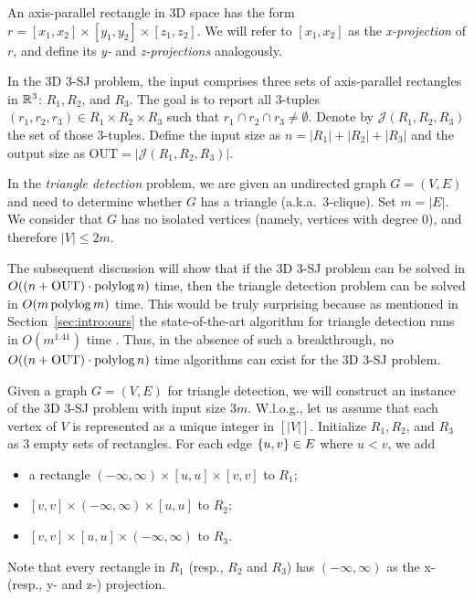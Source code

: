 \documentclass[sigconf]{acmart}
\def\vgap{\vspace{0mm}}
\def\J{\mathcal{J}}
\def\out{\mathrm{OUT}}
\begin{document}
{{{An axis-parallel rectangle in 3D space has the form $r = [x_1, x_2] \times [y_1, y_2] \times [z_1, z_2]$. We will refer to $[x_1, x_2]$ as the {\em x-projection} of $r$, and define its {\em y-} and {\em z-projections} analogously.


\vgap

In the 3D 3-SJ problem, the input comprises three sets of axis-parallel rectangles in $\mathbb{R}^3$: $R_1, R_2$, and $R_3$. The goal is to report all 3-tuples $(r_1, r_2, r_3) \in R_1 \times R_2 \times R_3$ such that $r_1 \cap r_2 \cap r_3 \neq \emptyset$. Denote by $\J(R_1, R_2, R_3)$ the set of those 3-tuples. Define the input size as $n = |R_1| + |R_2| + |R_3|$ and the output size as $\out = |\J(R_1, R_2, R_3)|$.

\vgap

In the {\em triangle detection} problem, we are given an undirected graph $G = (V, E)$ and need to determine whether $G$ has a triangle (a.k.a.\, 3-clique). Set $m = |E|$. We consider that $G$ has no isolated vertices (namely, vertices with degree 0), and therefore $|V| \le 2m$.

\vgap

The subsequent discussion will show that if the 3D 3-SJ problem can be solved in $O((n + \out) \cdot \polylog n)$ time, then the triangle detection problem can be solved in $O(m \operatorname*{polylog} m)$ time. This would be truly surprising because as mentioned in Section~\ref{sec:intro:ours} the state-of-the-art algorithm for triangle detection runs in $O(m^{1.41})$ time \cite{ayz97}. Thus, in the absence of such a breakthrough, no $O((n + \out) \cdot \polylog n)$ time algorithms can exist for the 3D 3-SJ problem.

\vgap

Given a graph $G = (V,E)$ for triangle detection, we will construct an instance of the 3D 3-SJ problem with input size $3m$. W.l.o.g., let us assume that each vertex of $V$ is represented as a unique integer in $[|V|]$. Initialize $R_1, R_2$, and $R_3$ as 3 empty sets of rectangles. For each edge $\{u, v\}\in E$ where $u < v$, we add
\begin{itemize}
    \item a rectangle $(-\infty, \infty) \times [u,u] \times [v,v]$ to $R_1$;
    \item $[v,v] \times(-\infty, \infty)\times [u,u]$ to $R_2$;
    \item $[v,v] \times [u,u] \times(-\infty, \infty) $ to $R_3$.
\end{itemize}
Note that every rectangle in $R_1$ (resp., $R_2$ and $R_3$) has $(-\infty, \infty)$ as the x- (resp., y- and z-) projection.

}}}
\end{document}
